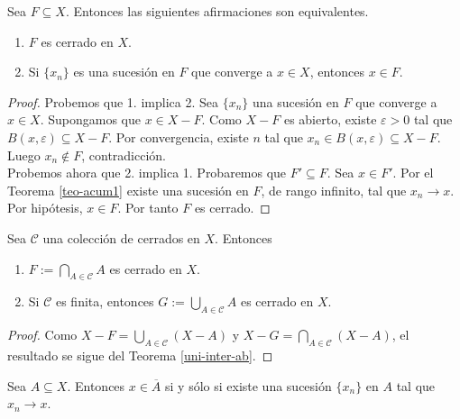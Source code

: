\begin{teorema}
Sea $F\subseteq X$. Entonces las siguientes afirmaciones son equivalentes.
\begin{enumerate}
    \item $F$ es cerrado en $X$.
    \item Si $\{x_n\}$ es una sucesión en $F$ que converge a $x\in X$, entonces $x\in F$.
\end{enumerate}
\end{teorema}
\begin{proof}
Probemos que 1. implica 2. Sea $\{x_n\}$ una sucesión en $F$ que converge a $x\in X$. Supongamos que $x\in X-F$. Como $X-F$ es abierto, existe $\varepsilon>0$ tal que $B(x,\varepsilon)\subseteq X-F$. Por convergencia, existe $n$ tal que $x_n\in B(x,\varepsilon)\subseteq X-F$. Luego $x_n\notin F$, contradicción.\\
Probemos ahora que 2. implica 1. Probaremos que $F'\subseteq F$. Sea $x\in F'$. Por el Teorema \ref{teo-acum1} existe una sucesión en $F$, de rango infinito, tal que $x_n\to x$. Por hipótesis, $x\in F$. Por tanto $F$ es cerrado.
\end{proof}

\begin{teorema}
Sea $\mathcal{C}$ una colección de cerrados en $X$. Entonces
\begin{enumerate}
    \item $F:=\bigcap_{A\in \mathcal{C}}A$ es cerrado en $X$.
    \item Si $\mathcal{C}$ es finita, entonces $G:=\bigcup_{A\in \mathcal{C}}A$ es cerrado en $X$.
\end{enumerate}
\end{teorema}
\begin{proof}
Como $X-F=\bigcup_{A\in\mathcal{C}}(X-A)$ y $X-G=\bigcap_{A\in\mathcal{C}}(X-A)$, el resultado se sigue del Teorema \ref{uni-inter-ab}.
\end{proof}

\begin{lema}\label{claus-suces}
Sea $A\subseteq X$. Entonces $x\in \overline{A}$ si y sólo si existe una sucesión $\{x_n\}$ en $A$ tal que $x_n\to x$.
\end{lema}
